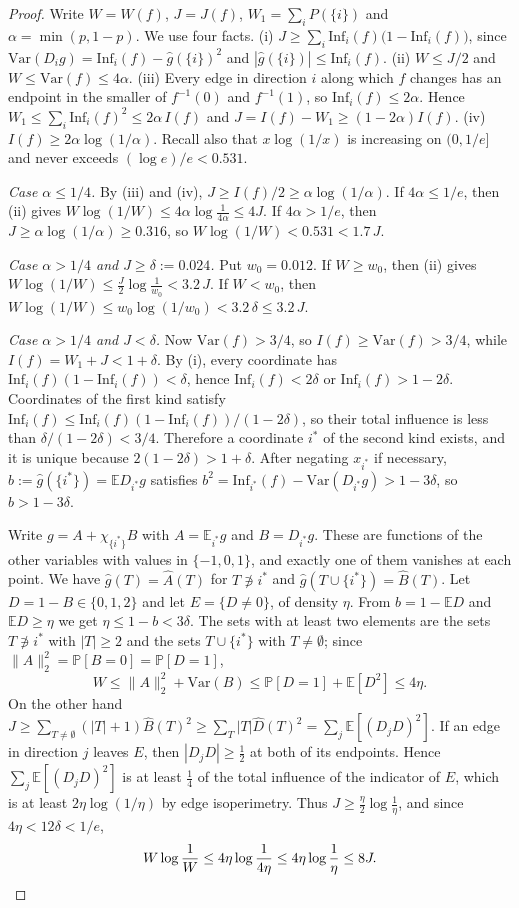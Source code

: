 \documentclass[11pt]{amsart}
\theoremstyle{definition}
\theoremstyle{remark}
\newcommand{\E}{\mathbb{E}}
\renewcommand{\Pr}{\mathbb{P}}
\newcommand{\Inf}{\mathrm{Inf}}
\newcommand{\Var}{\mathrm{Var}}
\newcommand{\hatg}{\widehat{g}}
\begin{document}
\begin{proof}
Write $W=W(f)$, $J=J(f)$, $W_1=\sum_iP(\{i\})$ and $\alpha=\min(p,1-p)$. We use four facts.
(i) $J\ge\sum_i\Inf_i(f)\bigl(1-\Inf_i(f)\bigr)$, since $\Var(D_ig)=\Inf_i(f)-\hatg(\{i\})^2$ and
$|\hatg(\{i\})|\le\Inf_i(f)$.
(ii) $W\le J/2$ and $W\le\Var(f)\le4\alpha$.
(iii) Every edge in direction $i$ along which $f$ changes has an endpoint in the smaller of $f^{-1}(0)$ and
$f^{-1}(1)$, so $\Inf_i(f)\le2\alpha$. Hence $W_1\le\sum_i\Inf_i(f)^2\le2\alpha\,I(f)$ and
$J=I(f)-W_1\ge(1-2\alpha)I(f)$.
(iv) $I(f)\ge2\alpha\log(1/\alpha)$.
Recall also that $x\log(1/x)$ is increasing on $(0,1/e]$ and never exceeds $(\log e)/e<0.531$.

\emph{Case $\alpha\le1/4$.} By (iii) and (iv), $J\ge I(f)/2\ge\alpha\log(1/\alpha)$. If $4\alpha\le1/e$, then
(ii) gives $W\log(1/W)\le4\alpha\log\frac1{4\alpha}\le4J$. If $4\alpha>1/e$, then $J\ge\alpha\log(1/\alpha)\ge0.316$,
so $W\log(1/W)<0.531<1.7\,J$.

\emph{Case $\alpha>1/4$ and $J\ge\delta:=0.024$.} Put $w_0=0.012$. If $W\ge w_0$, then (ii) gives
$W\log(1/W)\le\frac J2\log\frac1{w_0}<3.2\,J$. If $W<w_0$, then $W\log(1/W)\le w_0\log(1/w_0)<3.2\,\delta\le3.2\,J$.

\emph{Case $\alpha>1/4$ and $J<\delta$.} Now $\Var(f)>3/4$, so $I(f)\ge\Var(f)>3/4$, while $I(f)=W_1+J<1+\delta$.
By (i), every coordinate has $\Inf_i(f)(1-\Inf_i(f))<\delta$, hence $\Inf_i(f)<2\delta$ or $\Inf_i(f)>1-2\delta$.
Coordinates of the first kind satisfy $\Inf_i(f)\le\Inf_i(f)(1-\Inf_i(f))/(1-2\delta)$, so their total influence is
less than $\delta/(1-2\delta)<3/4$. Therefore a coordinate $i^\ast$ of the second kind exists, and it is unique
because $2(1-2\delta)>1+\delta$. After negating $x_{i^\ast}$ if necessary, $b:=\hatg(\{i^\ast\})=\E D_{i^\ast}g$ satisfies
$b^2=\Inf_{i^\ast}(f)-\Var(D_{i^\ast}g)>1-3\delta$, so $b>1-3\delta$.

Write $g=A+\chi_{\{i^\ast\}}B$ with $A=\E_{i^\ast}g$ and $B=D_{i^\ast}g$. These are functions of the other
variables with values in $\{-1,0,1\}$, and exactly one of them vanishes at each point. We have $\hatg(T)=\widehat A(T)$
for $T\not\ni i^\ast$ and $\hatg(T\cup\{i^\ast\})=\widehat B(T)$. Let $D=1-B\in\{0,1,2\}$ and let $E=\{D\ne0\}$, of
density $\eta$. From $b=1-\E D$ and $\E D\ge\eta$ we get $\eta\le1-b<3\delta$. The sets with at least two elements
are the sets $T\not\ni i^\ast$ with $|T|\ge2$ and the sets $T\cup\{i^\ast\}$ with $T\ne\emptyset$; since
$\|A\|_2^2=\Pr[B=0]=\Pr[D=1]$,
\[
W\le\|A\|_2^2+\Var(B)\le\Pr[D=1]+\E[D^2]\le4\eta .
\]
On the other hand $J\ge\sum_{T\ne\emptyset}(|T|+1)\widehat B(T)^2\ge\sum_T|T|\widehat D(T)^2=\sum_j\E[(D_jD)^2]$.
If an edge in direction $j$ leaves $E$, then $|D_jD|\ge\frac12$ at both of its endpoints. Hence
$\sum_j\E[(D_jD)^2]$ is at least $\frac14$ of the total influence of the indicator of $E$, which is at least
$2\eta\log(1/\eta)$ by edge isoperimetry. Thus $J\ge\frac\eta2\log\frac1\eta$, and since $4\eta<12\delta<1/e$,
\[
W\log\frac1W\le4\eta\log\frac1{4\eta}\le4\eta\log\frac1\eta\le8J.\qedhere
\]
\end{proof}
\end{document}
